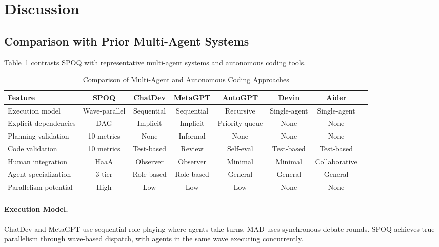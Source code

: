 \newpage
\section{Discussion}
\label{sec:discussion}

\subsection{Comparison with Prior Multi-Agent Systems}
\label{subsec:comparison}

Table~\ref{tab:comparison} contrasts SPOQ with representative
multi-agent systems and autonomous coding tools.

\begin{table}[htbp]
\centering
\caption{Comparison of Multi-Agent and Autonomous Coding Approaches}
\label{tab:comparison}
\footnotesize
\begin{tabular}{lccccccc}
\toprule
\textbf{Feature} & \textbf{SPOQ} & \textbf{ChatDev} & \textbf{MetaGPT} & \textbf{AutoGPT} & \textbf{Devin} & \textbf{Aider} \\
\midrule
Execution model & Wave-parallel & Sequential & Sequential & Recursive & Single-agent & Single-agent \\
Explicit dependencies & DAG & Implicit & Implicit & Priority queue & None & None \\
Planning validation & 10 metrics & None & Informal & None & None & None \\
Code validation & 10 metrics & Test-based & Review & Self-eval & Test-based & Test-based \\
Human integration & HaaA & Observer & Observer & Minimal & Minimal & Collaborative \\
Agent specialization & 3-tier & Role-based & Role-based & General & General & General \\
Parallelism potential & High & Low & Low & Low & None & None \\
\bottomrule
\end{tabular}
\end{table}

\paragraph{Execution Model.}
ChatDev and MetaGPT use sequential role-playing where agents take turns.
MAD uses synchronous debate rounds. SPOQ achieves true parallelism through
wave-based dispatch, with agents in the same wave executing concurrently.

